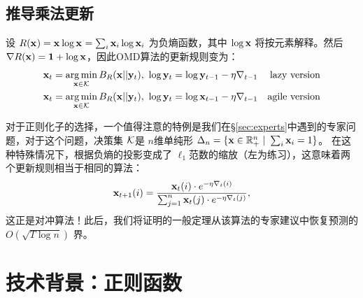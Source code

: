 \subsection{
	推导乘法更新
	} 

设 ${R}(\xv[]) =  \xv[] \log \xv[] = \sum_i \x_i \log \x_i$ 为负熵函数，其中 $\log \x$ 将按元素解释。然后 $\nabla {R}(\x) = \bone + \log \x$，因此OMD算法的更新规则变为：
\begin{align*}
	& \xv = \argmin_{\x \in \K} B_{R}(\x ||\yv)    , \ \log \yv =  \log \yv[t-1]  - \eta \nabla_{t-1}  & \mbox{lazy version}  \\
	& \xv = \argmin_{\x \in \K} B_{R}(\x ||\yv)    , \ \log \yv =  \log \xv[t-1]  - \eta \nabla_{t-1}  & \mbox{agile version} 
\end{align*}

对于正则化子的选择，一个值得注意的特例是我们在\S \ref{sec:experts}中遇到的专家问题，对于这个问题，决策集 $\K$是 $n$维单纯形 $ \Delta_n = \{ \x \in \reals^n_+ \ | \ \sum_i \x_i =  1  \}$。
在这种特殊情况下，根据负熵的投影变成了 $\ell_1$范数的缩放（左为练习），这意味着两个更新规则相当于相同的算法：
$$ \x_{t+1}(i) = \frac{\x_t(i) \cdot e^{-\eta \nabla_t(i)}}{\sum_{j=1}^n \x_t(j) \cdot e^{-\eta \nabla_t(j)} }, $$
这正是对冲算法！此后，我们将证明的一般定理从该算法的专家建议中恢复预测的 $O(\sqrt{T \log n })$ 界。



\section{
	技术背景：正则函数
	}

